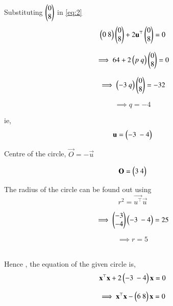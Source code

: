 \documentclass[journal,12pt,twocolumn]{IEEEtran}
\begin{document}
Substituting $\begin{pmatrix}0\\8\end{pmatrix}$ in \ref{eq:2}
\\
\begin{equation}
    \myvec{0\ 8}\myvec{0\\8}+2\vec{u^\top}\myvec{0\\8}=0
\end{equation}

\begin{equation}
\implies 64+2\myvec{p \ q}\myvec{0\\8}=0
\end{equation}

\begin{equation}
    \implies \myvec{-3 \ q}\myvec{0\\8}=-32
\end{equation}

\begin{equation}
\implies q=-4
\end{equation}

ie, 
\begin{equation}
    \vec{u}= \myvec{-3 \ -4}
\end{equation}

Centre of the circle, $\vec{O}= -\vec{u}$

\begin{equation}
    \mathbf{O}= \begin{pmatrix}3 \ 4\end{pmatrix}
\end{equation}

The radius of the circle can be found out using
\begin{equation}
    r^2= \vec{u^\top}\vec{u}
\end{equation}

\begin{equation}
    \implies \begin{pmatrix}-3\\-4\end{pmatrix}\begin{pmatrix}-3 \ -4\end{pmatrix} = 25
\end{equation}

\begin{equation}
    \implies r=5
\end{equation}

\\
Hence , the equation of the given circle is,
\begin{equation}
    \mathbf{x^\top}\mathbf{x}+2\begin{pmatrix}-3 \ -4 \end{pmatrix}\mathbf{x}=0
\end{equation}

\begin{equation}
   \implies \vec{x^\top}\vec{x}-\myvec{6 \ 8 }\vec{x}=0
\end{equation}
\end{document}
